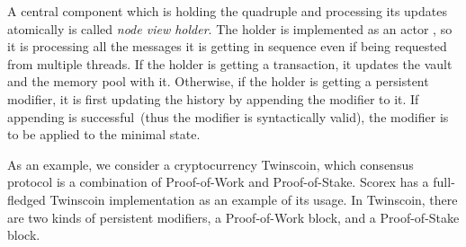 A central component which is holding the quadruple {\em <history, minimal state, vault, memory pool>} and processing its updates atomically is called {\em node view holder}. The holder is implemented as an actor , so it is processing all the messages it is getting in sequence even if being requested from multiple threads. If the holder is getting a transaction, it updates the vault and the memory pool with it. Otherwise, if the holder is getting a persistent modifier, it is first updating the history by appending the modifier to it. If appending is successful~(thus the modifier is syntactically valid), the modifier is to be applied to the minimal state.  

As an example, we consider a cryptocurrency Twinscoin, which consensus protocol is a combination of Proof-of-Work and Proof-of-Stake. Scorex has a full-fledged Twinscoin implementation as an example of its usage. In Twinscoin, there are two kinds of persistent modifiers, a Proof-of-Work block, and a Proof-of-Stake block. 
